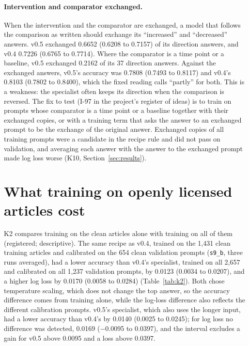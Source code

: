 \documentclass[11pt,letterpaper]{article}
\newcommand{\sysname}[1]{\texttt{#1}}
\begin{document}
\paragraph{Intervention and comparator exchanged.} When the intervention and the comparator are exchanged, a model that follows the comparison as written should exchange its ``increased'' and ``decreased'' answers. v0.5 exchanged 0.6652 (0.6208 to 0.7157) of its direction answers, and v0.4 0.7226 (0.6765 to 0.7714). Where the comparator is a time point or a baseline, v0.5 exchanged 0.2162 of its 37 direction answers. Against the exchanged answers, v0.5's accuracy was 0.7808 (0.7493 to 0.8117) and v0.4's 0.8103 (0.7802 to 0.8400), which the fixed reading calls ``partly'' for both. This is a weakness: the specialist often keeps its direction when the comparison is reversed. The fix to test (I-97 in the project's register of ideas) is to train on prompts whose comparator is a time point or a baseline together with their exchanged copies, or with a training term that asks the answer to an exchanged prompt to be the exchange of the original answer. Exchanged copies of all training prompts were a candidate in the recipe rule and did not pass on validation, and averaging each answer with the answer to the exchanged prompt made log loss worse (K10, Section~\ref{sec:results}).

\section{What training on openly licensed articles cost}
\label{sec:license}

K2 compares training on the clean articles alone with training on all of them (registered; descriptive). The same recipe as v0.4, trained on the 1,431 clean training articles and calibrated on the 654 clean validation prompts (\sysname{s9\_b}, three runs averaged), had a lower accuracy than v0.4's specialist, trained on all 2,657 and calibrated on all 1,237 validation prompts, by 0.0123 (0.0034 to 0.0207), and a higher log loss by 0.0170 (0.0058 to 0.0284) (Table~\ref{tab:k2}). Both chose temperature scaling, which does not change the top answer, so the accuracy difference comes from training alone, while the log-loss difference also reflects the different calibration prompts. v0.5's specialist, which also uses the longer input, had a lower accuracy than v0.4's by 0.0140 (0.0025 to 0.0245); for log loss no difference was detected, 0.0169 ($-$0.0095 to 0.0397), and the interval excludes a gain for v0.5 above 0.0095 and a loss above 0.0397.
\end{document}
